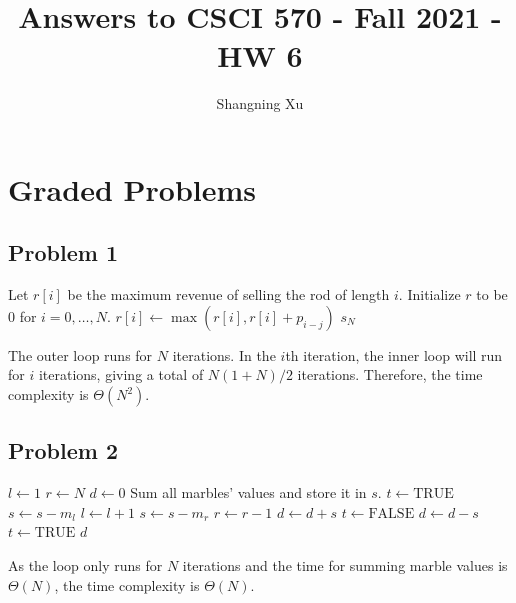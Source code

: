 \documentclass{article}
\title{Answers to CSCI 570 - Fall 2021 - HW 6}
\author{Shangning Xu}
\begin{document}
\maketitle

\section*{Graded Problems}

\subsection*{Problem 1}

\begin{algorithmic}[1]
    \State Let $r[i]$ be the maximum revenue of selling the rod of length $i$.
    \State Initialize $r$ to be 0 for $i = 0, \dots, N$.
            \State $r[i] \gets \max(r[i], r[i] + p_{i - j})$
        \EndFor
    \EndFor
    \State \Return $s_N$
\end{algorithmic}

The outer loop runs for $N$ iterations. In the $i$th iteration, the inner loop will run for $i$ iterations, giving a total of $N(1 + N)/2$ iterations. Therefore, the time complexity is $\Theta(N^2)$.

\subsection*{Problem 2}

\begin{algorithmic}[1]
    \State $l \gets 1$
    \State $r \gets N$
    \State $d \gets 0$ 
    \State Sum all marbles' values and store it in $s$.
    \State $t \gets \mathrm{TRUE}$ 
         
            \State $s \gets s - m_l$
            \State $l \gets l + 1$
        \Else
            \State $s \gets s - m_r$
            \State $r \gets r - 1$
        \EndIf
            \State $d \gets d + s$
            \State $t \gets \mathrm{FALSE}$
        \Else
            \State $d \gets d - s$
            \State $t \gets \mathrm{TRUE}$
        \EndIf
    \EndWhile
    \State \Return $d$
\end{algorithmic}

As the loop only runs for $N$ iterations and the time for summing marble values is $\Theta(N)$, the time complexity is $\Theta(N)$.
\end{document}
